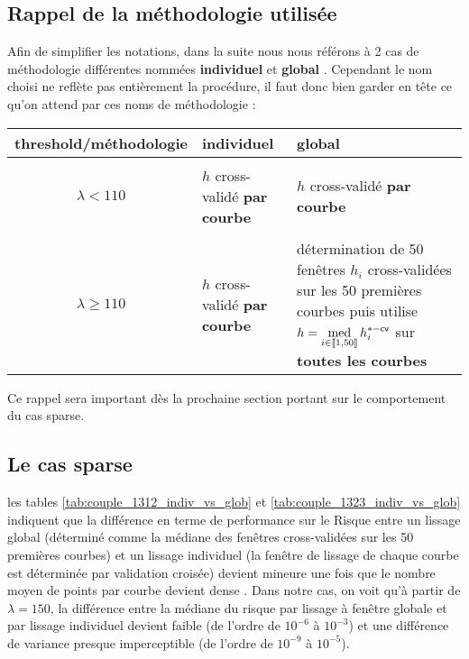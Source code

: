 \subsection{Rappel de la méthodologie utilisée}

Afin de simplifier les notations, dans la suite nous nous référons à 2 cas de méthodologie différentes nommées \og \textbf{individuel} \fg et \og \textbf{global} \fg. Cependant le nom choisi ne reflète pas entièrement la procédure, il faut donc bien garder en tête ce qu'on attend par ces noms de méthodologie :

\begin{table}[H]
	\centering
	\begin{tabularx}{\textwidth}{c|X|X}
		\toprule
		threshold/méthodologie & \textbf{individuel}                  & \textbf{global}                                                                                                                                                                                                               \\
		\bottomrule
		\\
		$\lambda < 110$        & $h$ cross-validé \textbf{par courbe} & $h$ cross-validé \textbf{par courbe}
		\\
		\midrule
		\\
		$\lambda \geq 110$     & $h$ cross-validé \textbf{par courbe} & détermination de 50 fenêtres $h_i$ cross-validées sur les 50 premières courbes puis utilise $h = \operatornamewithlimits{med}\limits_{i \in \llbracket 1, 50 \rrbracket} h_i^{*-\textsf{cv}}$ sur \textbf{toutes les courbes}
		\\
		\bottomrule
	\end{tabularx}
\end{table}

Ce rappel sera important dès la prochaine section portant sur le comportement du cas sparse.

\subsection{Le cas sparse}
\label{annexe:lissage_fail}

les tables \ref{tab:couple_1312_indiv_vs_glob} et \ref{tab:couple_1323_indiv_vs_glob} indiquent que la différence en terme de performance sur le Risque entre un lissage global (déterminé comme la médiane des fenêtres cross-validées sur les 50 premières courbes) et un lissage individuel (la fenêtre de lissage de chaque courbe est déterminée par validation croisée) devient mineure une fois que le nombre moyen de points par courbe devient \og dense \fg. Dans notre cas, on voit qu'à partir de $\lambda = 150$, la différence entre la médiane du risque par lissage à fenêtre globale et par lissage individuel devient faible (de l'ordre de $10^{-6}$ à $10^{-3}$) et une différence de variance presque imperceptible (de l'ordre de $10^{-9}$ à $10^{-5}$).




